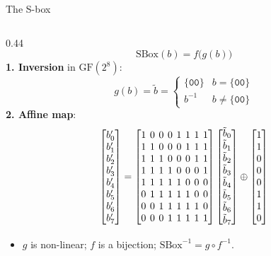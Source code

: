 \documentclass[aspectratio=169,10pt]{beamer}
\newcommand{\xor}{\oplus}
\newcommand{\GF}{\mathrm{GF}(2^8)}
\newcommand{\fn}[1]{\mathrm{#1}}
\newcommand{\hx}[1]{\ensuremath{\mathtt{\{#1\}}}}            %
\begin{document}
\begin{frame}{The S-box}
\begin{columns}[T]
\begin{column}{0.44\textwidth}
\small
\[ \fn{SBox}(b)=f\big(g(b)\big) \]
\textbf{1. Inversion} in $\GF$:
\[ g(b)=\tilde b=\begin{cases}\hx{00}& b=\hx{00}\\ b^{-1} & b\neq\hx{00}\end{cases}\]\vskip-4pt
\textbf{2. Affine map}:
\scriptsize
\[\setlength{\arraycolsep}{2pt}
\begin{bmatrix}b'_0\\b'_1\\b'_2\\b'_3\\b'_4\\b'_5\\b'_6\\b'_7\end{bmatrix}=
\begin{bmatrix}
1&0&0&0&1&1&1&1\\1&1&0&0&0&1&1&1\\1&1&1&0&0&0&1&1\\1&1&1&1&0&0&0&1\\
1&1&1&1&1&0&0&0\\0&1&1&1&1&1&0&0\\0&0&1&1&1&1&1&0\\0&0&0&1&1&1&1&1\end{bmatrix}
\begin{bmatrix}\tilde b_0\\\tilde b_1\\\tilde b_2\\\tilde b_3\\\tilde b_4\\\tilde b_5\\\tilde b_6\\\tilde b_7\end{bmatrix}\xor
\begin{bmatrix}1\\1\\0\\0\\0\\1\\1\\0\end{bmatrix}\]
\vskip-6pt
\begin{itemize}\scriptsize
\item $g$ is non-linear; $f$ is a bijection; $\fn{SBox}^{-1}=g\circ f^{-1}$.

\end{itemize}
\end{column}
\end{columns}
\end{frame}
\end{document}
